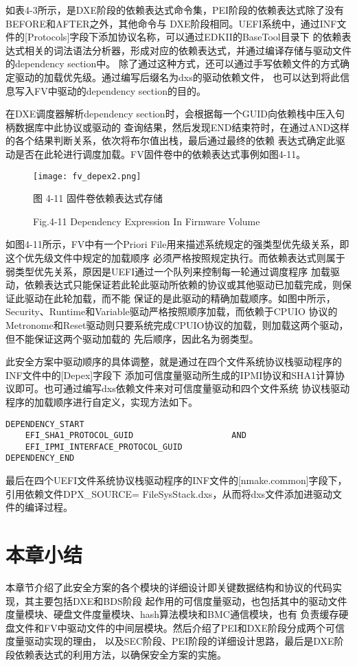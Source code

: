 如表4-3所示，是DXE阶段的依赖表达式命令集，PEI阶段的依赖表达式除了没有BEFORE和AFTER之外，其他命令与
DXE阶段相同。UEFI系统中，通过INF文件的[Protocols]字段下添加协议名称，可以通过EDKII的BaseTool目录下
的依赖表达式相关的词法语法分析器，形成对应的依赖表达式，并通过编译存储与驱动文件的dependency section中。
除了通过这种方式，还可以通过手写依赖文件的方式确定驱动的加载优先级。通过编写后缀名为dxs的驱动依赖文件，
也可以达到将此信息写入FV中驱动的dependency section的目的。
\par 在DXE调度器解析dependency section时，会根据每一个GUID向依赖栈中压入句柄数据库中此协议或驱动的
查询结果，然后发现END结束符时，在通过AND这样的各个结果判断关系，依次将布尔值出栈，最后通过最终的依赖
表达式确定此驱动是否在此轮进行调度加载。FV固件卷中的依赖表达式事例如图4-11。

\begin{figure}[htb]
    \vspace{0cm}   
    \setlength{\abovecaptionskip}{0.3cm}
	\centering
    \texttt{[image: fv\_depex2.png]}
    \caption*{图 4-11 固件卷依赖表达式存储}
    \setlength{\belowcaptionskip}{-0.5cm}
    \caption*{Fig.4-11 Dependency Expression In Firmware Volume}
\end{figure}

如图4-11所示，FV中有一个Priori File用来描述系统规定的强类型优先级关系，即这个优先级文件中规定的加载顺序
必须严格按照规定执行。而依赖表达式则属于弱类型优先关系，原因是UEFI通过一个队列来控制每一轮通过调度程序
加载驱动，依赖表达式只能保证若此轮此驱动所依赖的协议或其他驱动已加载完成，则保证此驱动在此轮加载，而不能
保证的是此驱动的精确加载顺序。如图中所示，Security、Runtime和Variable驱动严格按照顺序加载，而依赖于CPUIO
协议的Metronome和Reset驱动则只要系统完成CPUIO协议的加载，则加载这两个驱动，但不能保证这两个驱动加载的
先后顺序，因此名为弱类型。
\par 此安全方案中驱动顺序的具体调整，就是通过在四个文件系统协议栈驱动程序的INF文件中的[Depex]字段下
添加可信度量驱动所生成的IPMI协议和SHA1计算协议即可。也可通过编写dxs依赖文件来对可信度量驱动和四个文件系统
协议栈驱动程序的加载顺序进行自定义，实现方法如下。

\begin{lstlisting}
DEPENDENCY_START
    EFI_SHA1_PROTOCOL_GUID                    AND
    EFI_IPMI_INTERFACE_PROTOCOL_GUID
DEPENDENCY_END
\end{lstlisting}
\par 最后在四个UEFI文件系统协议栈驱动程序的INF文件的[nmake.common]字段下，引用依赖文件DPX\_SOURCE=
FileSysStack.dxs，从而将dxs文件添加进驱动文件的编译过程。

%
%
\section{本章小结}
本章节介绍了此安全方案的各个模块的详细设计即关键数据结构和协议的代码实现，其主要包括DXE和BDS阶段
起作用的可信度量驱动，也包括其中的驱动文件度量模块、硬盘文件度量模块、hash算法模块和BMC通信模块，也有
负责缓存硬盘文件和FV中驱动文件的中间层模块。然后介绍了PEI和DXE阶段分成两个可信度量驱动实现的理由，
以及SEC阶段、PEI阶段的详细设计思路，最后是DXE阶段依赖表达式的利用方法，以确保安全方案的实施。

\bjutclearpage
